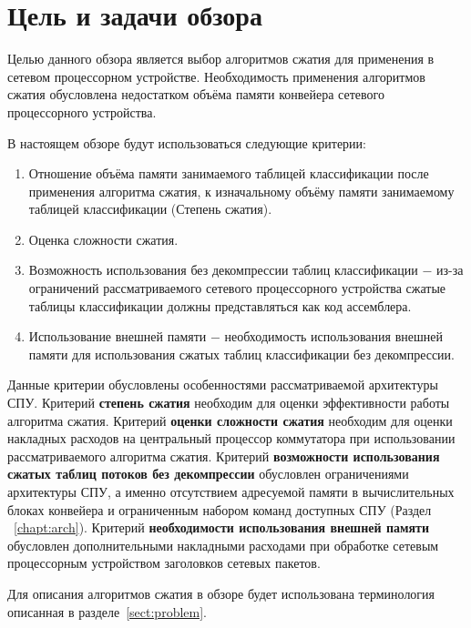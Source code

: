 \documentclass[a4paper, 12pt, titlepage, finall]{extreport}
\begin{document}
        \section{Цель и задачи обзора}
        Целью данного обзора является выбор алгоритмов сжатия для применения в сетевом процессорном устройстве. 
        Необходимость применения алгоритмов сжатия обусловлена недостатком объёма памяти конвейера сетевого процессорного устройства.
        
        В настоящем обзоре будут использоваться следующие критерии:
        \begin{enumerate}
            \item Отношение объёма памяти занимаемого таблицей классификации после применения алгоритма сжатия, 
                к изначальному объёму памяти занимаемому таблицей классификации (Степень сжатия).
            \item Оценка сложности сжатия.
            \item Возможность использования без декомпрессии таблиц классификации $-$ 
                из-за ограничений рассматриваемого сетевого процессорного устройства сжатые таблицы классификации 
                должны представляться как код ассемблера.
            \item Использование внешней памяти $-$ необходимость использования внешней памяти 
                для использования сжатых таблиц классификации без декомпрессии.
        \end{enumerate}

        Данные критерии обусловлены особенностями рассматриваемой архитектуры СПУ. 
        Критерий \textbf{степень сжатия} необходим для оценки эффективности работы алгоритма сжатия.
        Критерий \textbf{оценки сложности сжатия} необходим для оценки накладных расходов на центральный процессор коммутатора при использовании рассматриваемого
        алгоритма сжатия.
        Критерий \textbf{возможности использования сжатых таблиц потоков без декомпрессии} обусловлен ограничениями архитектуры СПУ, а именно
        отсутствием адресуемой памяти в вычислительных блоках конвейера и ограниченным набором команд доступных СПУ (Раздел ~\ref{chapt:arch}).
        Критерий \textbf{необходимости использования внешней памяти} обусловлен дополнительными накладными расходами при обработке сетевым процессорным устройством 
        заголовков сетевых пакетов.

        Для описания алгоритмов сжатия в обзоре будет использована терминология описанная в разделе~\ref{sect:problem}. 
\end{document}
